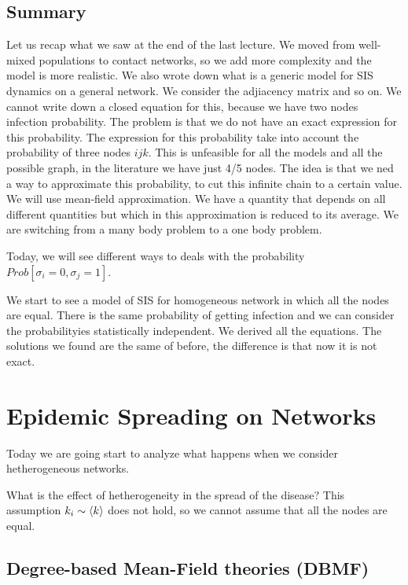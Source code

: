 \documentclass[../main/main.tex]{subfiles}
\begin{document}

\section{Summary}

Let us recap what we saw at the end of the last lecture. We moved from well-mixed populations to contact networks, so we add more complexity and the model is more realistic.
We also wrote down what is a generic model for SIS dynamics on a general network. We consider the adjiacency matrix and so on. We cannot write down a closed equation for this, because we have two nodes infection probability. The problem is that we do not have an exact expression for this probability. The expression for this probability take into account the probability of three nodes \( i j k \). This is unfeasible for all the models and all the possible graph, in the literature we have just 4/5 nodes. The idea is that we ned a way to approximate this probability, to cut this infinite chain to a certain value. We will use mean-field approximation. We have a quantity that depends on all different quantities but which in this approximation is reduced to its average. We are switching from a many body problem to a one body problem.

Today, we will see different ways to deals with the probability \( Prob[\sigma _i = 0, \sigma _j=1] \).

We start to see a model of SIS for homogeneous network in which all the nodes are equal. There is the same probability of getting infection and we can consider the probabilityies statistically independent.
We derived all the equations. The solutions we found are the same of before, the difference is that now it is not exact.


\chapter{Epidemic Spreading on Networks}

Today we are going start to analyze what happens when we consider hetherogeneous networks.

What is the effect of hetherogeneity in the spread of the disease? This assumption \( k_i \sim \expval{k}  \) does not hold, so we cannot assume that all the nodes are equal.

\section{Degree-based Mean-Field theories (DBMF)}
\end{document}
